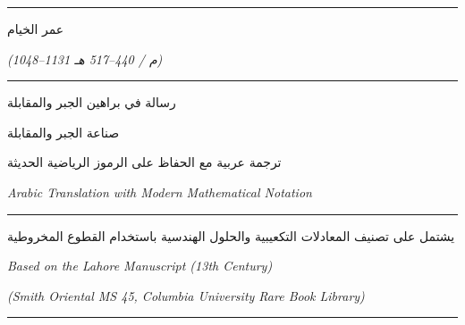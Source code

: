 \documentclass[11pt,a4paper]{book}
\newcommand{\arLarge}[1]{{\Large\leavevmode\arabicfont\beginR #1\endR}}
\newcommand{\arHuge}[1]{{\Huge\leavevmode\arabicfont\beginR #1\endR}}
\newcommand{\arLARGE}[1]{{\LARGE\leavevmode\arabicfont\beginR #1\endR}}
\begin{document}
\begin{titlepage}
\begin{center}

\vspace*{1.5cm}

{\color{titlecolor}\rule{\textwidth}{1.5pt}}

\vspace{1cm}

{\arHuge{عمر الخيام}}

\vspace{0.5cm}

{\large\itshape (1048--1131 م / 440--517 هـ)}

\vspace{1.5cm}

{\color{titlecolor}\rule{0.7\textwidth}{0.8pt}}

\vspace{1.5cm}

{\arHuge{رسالة في براهين الجبر والمقابلة}}

\vspace{0.8cm}

{\arLARGE{صناعة الجبر والمقابلة}}

\vspace{1cm}

{\arLarge{ترجمة عربية مع الحفاظ على الرموز الرياضية الحديثة}}

\vspace{0.5cm}

{\normalsize\textit{Arabic Translation with Modern Mathematical Notation}}

\vspace{1.5cm}

{\color{titlecolor}\rule{0.7\textwidth}{0.8pt}}

\vspace{1cm}

{\arLarge{يشتمل على تصنيف المعادلات التكعيبية والحلول الهندسية باستخدام القطوع المخروطية}}

\vspace{2cm}

{\small\textit{Based on the Lahore Manuscript (13th Century)}}

\vspace{0.3cm}

{\small\textit{(Smith Oriental MS 45, Columbia University Rare Book Library)}}

\vspace{1cm}

{\color{titlecolor}\rule{\textwidth}{1.5pt}}

\end{center}
\end{titlepage}
\end{document}
